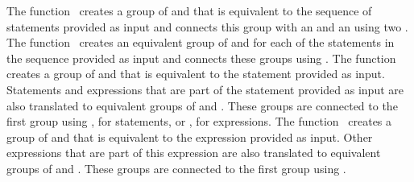 The function~ creates a group of \ActivityNodes and \ActivityEdges that is equivalent to the sequence of statements provided as input and connects this group with an \InitialNode and an \ActivityFinalNode using two \ControlFlows.
The function~ creates an equivalent group of \ActivityNodes and \ActivityEdges for each of the statements in the sequence provided as input and connects these groups using \ControlFlows.
The function~ creates a group of \ActivityNodes and \ActivityEdges that is equivalent to the statement provided as input.
Statements and expressions that are part of the statement provided as input are also translated to equivalent groups of \ActivityNodes and \ActivityEdges.
These groups are connected to the first group using \ControlFlows, for statements, or \ObjectFlows, for expressions.
The function~ creates a group of \ActivityNodes and \ActivityEdges that is equivalent to the expression provided as input.
Other expressions that are part of this expression are also translated to equivalent groups of \ActivityNodes and \ActivityEdges.
These groups are connected to the first group using \ObjectFlows. 